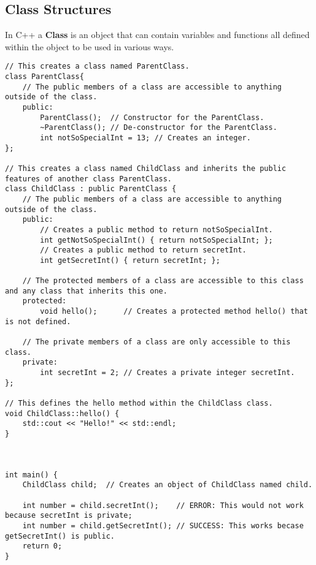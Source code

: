 \subsection{Class Structures}
In C++ a \textbf{Class} is an object that can contain variables and functions all defined within the object to be used in various ways.
\begin{lstlisting}
// This creates a class named ParentClass.
class ParentClass{
	// The public members of a class are accessible to anything outside of the class.
	public:
		ParentClass();  // Constructor for the ParentClass.
		~ParentClass(); // De-constructor for the ParentClass.
		int notSoSpecialInt = 13; // Creates an integer.
};

// This creates a class named ChildClass and inherits the public features of another class ParentClass.
class ChildClass : public ParentClass {
	// The public members of a class are accessible to anything outside of the class.
	public:
		// Creates a public method to return notSoSpecialInt.
		int getNotSoSpecialInt() { return notSoSpecialInt; }; 
		// Creates a public method to return secretInt.
		int getSecretInt() { return secretInt; };  
		
	// The protected members of a class are accessible to this class and any class that inherits this one.
	protected:
		void hello();      // Creates a protected method hello() that is not defined.
		
	// The private members of a class are only accessible to this class.
	private:
		int secretInt = 2; // Creates a private integer secretInt.
};

// This defines the hello method within the ChildClass class.
void ChildClass::hello() {
	std::cout << "Hello!" << std::endl;
}



int main() {
	ChildClass child;  // Creates an object of ChildClass named child.
	
	int number = child.secretInt();    // ERROR: This would not work because secretInt is private;
	int number = child.getSecretInt(); // SUCCESS: This works becase getSecretInt() is public.
	return 0;
}
\end{lstlisting}



















